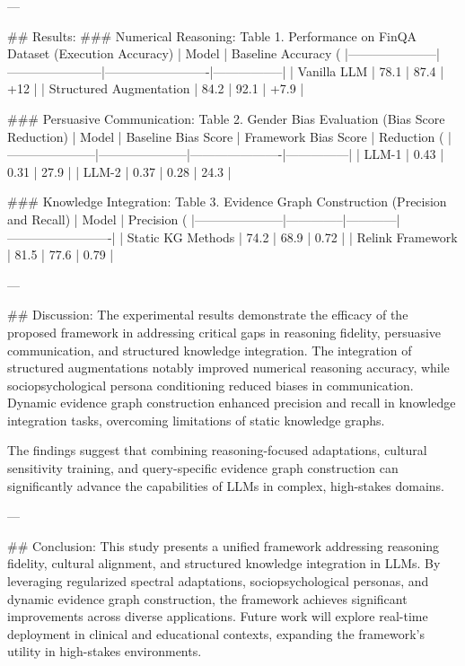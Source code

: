 ---

## Results:
### Numerical Reasoning:
Table 1. Performance on FinQA Dataset (Execution Accuracy)
| Model               | Baseline Accuracy (%
|---------------------|-----------------------|-------------------------|-----------------|
| Vanilla LLM         | 78.1                 | 87.4                    | +12             |
| Structured Augmentation | 84.2             | 92.1                    | +7.9            |

### Persuasive Communication:
Table 2. Gender Bias Evaluation (Bias Score Reduction)
| Model               | Baseline Bias Score | Framework Bias Score | Reduction (%
|---------------------|---------------------|----------------------|---------------|
| LLM-1               | 0.43               | 0.31                 | 27.9          |
| LLM-2               | 0.37               | 0.28                 | 24.3          |

### Knowledge Integration:
Table 3. Evidence Graph Construction (Precision and Recall)
| Model               | Precision (%
|---------------------|--------------|------------|-------------------------|
| Static KG Methods   | 74.2         | 68.9       | 0.72                   |
| Relink Framework    | 81.5         | 77.6       | 0.79                   |

---

## Discussion:
The experimental results demonstrate the efficacy of the proposed framework in addressing critical gaps in reasoning fidelity, persuasive communication, and structured knowledge integration. The integration of structured augmentations notably improved numerical reasoning accuracy, while sociopsychological persona conditioning reduced biases in communication. Dynamic evidence graph construction enhanced precision and recall in knowledge integration tasks, overcoming limitations of static knowledge graphs.

The findings suggest that combining reasoning-focused adaptations, cultural sensitivity training, and query-specific evidence graph construction can significantly advance the capabilities of LLMs in complex, high-stakes domains.

---

## Conclusion:
This study presents a unified framework addressing reasoning fidelity, cultural alignment, and structured knowledge integration in LLMs. By leveraging regularized spectral adaptations, sociopsychological personas, and dynamic evidence graph construction, the framework achieves significant improvements across diverse applications. Future work will explore real-time deployment in clinical and educational contexts, expanding the framework’s utility in high-stakes environments.


